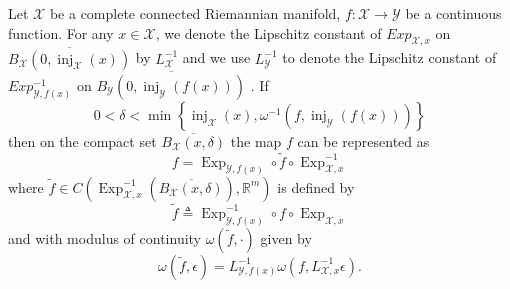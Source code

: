 \documentclass[anon,12pt]{colt2021} %
\newcommand{\rr}{{\mathbb{R}}}
\newcommand{\rrflex}[1]{{\ensuremath{\rr^{#1}
}}}
\newcommand{\rrm}{{\rrflex{m}}}
\newcommand{\xxx}{\mathcal{X}}
\newcommand{\yyy}{\mathcal{Y}}
\begin{document}
\begin{lemma}\label{lem_local_representation}
Let $\xxx$ be a complete connected Riemannian manifold, $f:\xxx\rightarrow\yyy$ be a continuous function.  
For any $x \in \xxx$, we denote the 
Lipschitz constant of $Exp_{\xxx, x}$ on 
$\overline{B_{\xxx}(0,\operatorname{inj}_{\xxx}(x))}$
by $L^{-1}_{\xxx}$ and we use $L^{-1}_{\yyy}$ to denote the Lipschitz constant of $Exp_{\yyy, f(x)}^{-1}$ on 
$\overline{B_{\yyy}(0,\operatorname{inj}_{\yyy}(f(x)))}$
.  
If 
$$
0<\delta < 
\min\left\{
\operatorname{inj}_{\xxx}(x),
\omega^{-1}\left(f,
\operatorname{inj}_{\yyy}(f(x))
\right)
\right\}
$$
then on the compact set $\overline{B_{\xxx}(x,\delta)}$ the map $f$ can be represented as 
\begin{equation}
    f=\operatorname{Exp}_{\yyy,f(x)}\circ \tilde{f}\circ \operatorname{Exp}_{\xxx,x}^{-1}
    \label{eq_representation_of_f_locally}
\end{equation}
where $\tilde{f}\in C\left(
\operatorname{Exp}_{\xxx,x}^{-1}\left(
    \overline{B_{\xxx}(x,\delta)}
    \right)
    ,\rrm\right)$ is defined by
    \begin{equation}
    \tilde{f} \triangleq  
    \operatorname{Exp}_{\yyy,f(x)}^{-1}
    \circ 
    f
    \circ 
    \operatorname{Exp}_{\xxx,x}
    \end{equation}
    and with modulus of continuity $\omega(\tilde{f},\cdot)$ given by
    \begin{equation}
    \omega(\tilde{f},\epsilon) = 
    L_{\yyy,f(x)}^{-1}\omega\left(
    f,L_{\xxx,x}^{-1}\epsilon
    \right)
    .
    \label{eq_representation_of_f_tilde_locally}
\end{equation}
\end{lemma}
\end{document}
